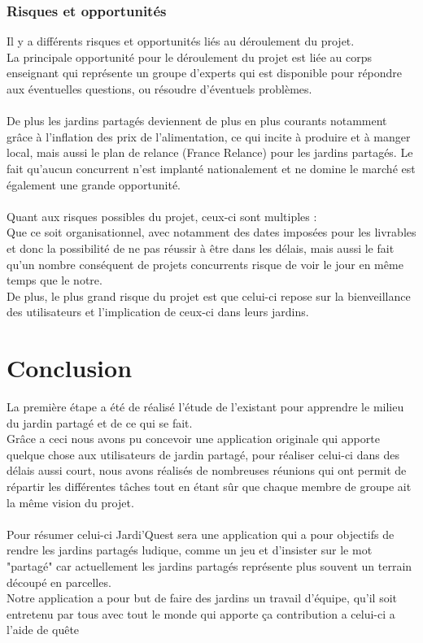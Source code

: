\documentclass{report}
\begin{document}
\subsection*{Risques et opportunités}
Il y a différents risques et opportunités liés au déroulement du projet. \\ 
La principale opportunité pour le déroulement du projet est liée au corps enseignant qui représente un groupe d'experts qui est disponible pour répondre aux éventuelles questions, ou résoudre d'éventuels problèmes. \\ \\ 
De plus les jardins partagés deviennent de plus en plus courants notamment grâce à l'inflation des prix de l’alimentation, ce qui incite à produire et à manger local, mais aussi le plan de relance (France Relance) pour les jardins partagés. Le fait qu'aucun concurrent n'est implanté nationalement et ne domine le marché est également une grande opportunité. \\  \\ 
Quant aux risques possibles du projet, ceux-ci sont multiples :  \\ 
Que ce soit organisationnel, avec notamment des dates imposées pour les livrables et donc la possibilité de ne pas réussir à être dans les délais, mais aussi le fait qu'un nombre conséquent de projets concurrents risque de voir le jour en même temps que le notre. \\ 
De plus, le plus grand risque du projet est que celui-ci repose sur la bienveillance des utilisateurs et l'implication de ceux-ci dans leurs jardins.




\chapter*{Conclusion}
La première étape a été de réalisé l'étude de l'existant pour apprendre le milieu du jardin partagé et de ce qui se fait. \\ 
Grâce a ceci nous avons pu concevoir une application originale qui apporte quelque chose aux utilisateurs de jardin partagé, pour réaliser celui-ci dans des délais aussi court, nous avons réalisés de nombreuses réunions qui ont permit de répartir les différentes tâches tout en étant sûr que chaque membre de groupe ait la même vision du projet. \\ \\ 
Pour résumer celui-ci Jardi'Quest sera une application qui a pour objectifs de rendre les jardins partagés ludique, comme un jeu et d'insister sur le mot "partagé" car actuellement les jardins partagés représente plus souvent un terrain découpé en parcelles. \\ 
Notre application a pour but de faire des jardins un travail d'équipe, qu'il soit entretenu par tous avec tout le monde qui apporte ça contribution a celui-ci a l'aide de quête
\end{document}
